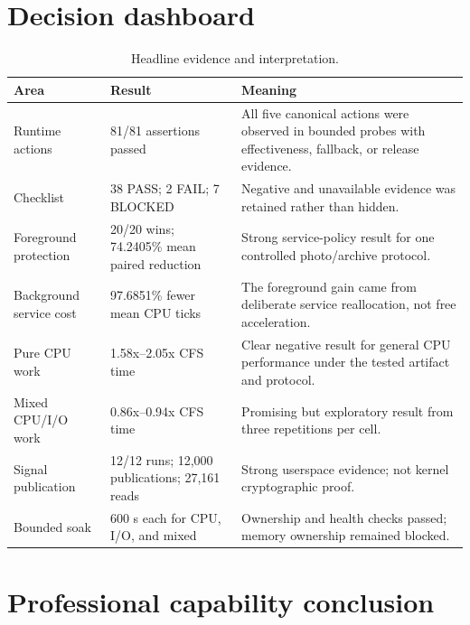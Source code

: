 \documentclass[11pt,a4paper,oneside]{report}
\begin{document}
\begin{center}
\end{center}

\section{Decision dashboard}

\begin{table}[H]
\centering
\caption{Headline evidence and interpretation.}
\begin{tabularx}{\textwidth}{@{}p{46mm}p{38mm}Y@{}}
\toprule
\textbf{Area} & \textbf{Result} & \textbf{Meaning} \\
\midrule
Runtime actions & 81/81 assertions passed & All five canonical actions were
observed in bounded probes with effectiveness, fallback, or release evidence. \\
Checklist & 38 PASS; 2 FAIL; 7 BLOCKED & Negative and unavailable evidence was
retained rather than hidden. \\
Foreground protection & 20/20 wins; 74.2405\% mean paired reduction & Strong
service-policy result for one controlled photo/archive protocol. \\
Background service cost & 97.6851\% fewer mean CPU ticks & The foreground gain
came from deliberate service reallocation, not free acceleration. \\
Pure CPU work & 1.58x--2.05x CFS time & Clear negative result for general CPU
performance under the tested artifact and protocol. \\
Mixed CPU/I/O work & 0.86x--0.94x CFS time & Promising but exploratory result
from three repetitions per cell. \\
Signal publication & 12/12 runs; 12,000 publications; 27,161 reads & Strong
userspace evidence; not kernel cryptographic proof. \\
Bounded soak & 600 s each for CPU, I/O, and mixed & Ownership and health checks
passed; memory ownership remained blocked. \\
\bottomrule
\end{tabularx}
\end{table}

\section{Professional capability conclusion}
\end{document}
